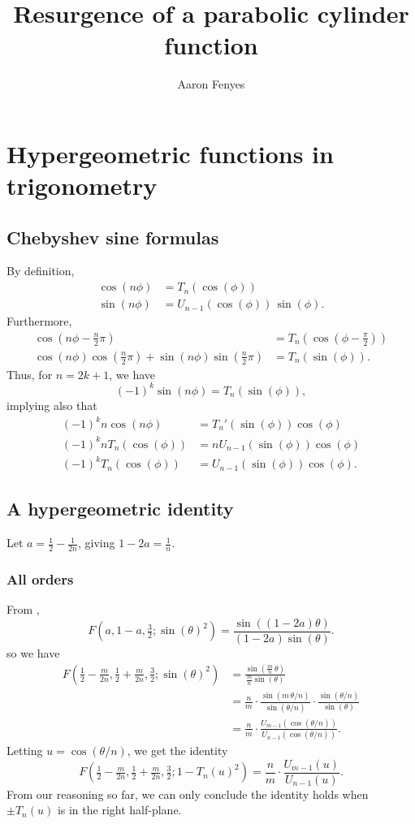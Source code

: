 \documentclass{article}
\title{Resurgence of a parabolic cylinder function}
\author{Aaron Fenyes}
\begin{document}
\maketitle
\section{Hypergeometric functions in trigonometry}
\subsection{Chebyshev sine formulas}
By definition,
\begin{align*}
\cos(n\phi) & = T_n(\cos(\phi)) \\
\sin(n\phi) & = U_{n-1}(\cos(\phi))\,\sin(\phi).
\end{align*}
Furthermore,
\begin{align*}
\cos(n\phi - \tfrac{n}{2}\pi) & = T_n(\cos(\phi - \tfrac{\pi}{2})) \\
\cos(n\phi) \cos(\tfrac{n}{2}\pi) + \sin(n\phi) \sin(\tfrac{n}{2}\pi) & = T_n(\sin(\phi)).
\end{align*}
Thus, for $n = 2k + 1$, we have
\[ (-1)^k \sin(n\phi) = T_n(\sin(\phi)), \]
implying also that
\begin{align*}
(-1)^k n \cos(n\phi) & = T_n'(\sin(\phi)) \cos(\phi) \\
(-1)^k n T_n(\cos(\phi)) & = nU_{n-1}(\sin(\phi)) \cos(\phi) \\
(-1)^k T_n(\cos(\phi)) & = U_{n-1}(\sin(\phi)) \cos(\phi).
\end{align*}
\subsection{A hypergeometric identity}
Let $a = \tfrac{1}{2} - \tfrac{1}{2n}$, giving $1 - 2a = \tfrac{1}{n}$.
\subsubsection{All orders}\label{all-orders}
From \cite[equation~15.4.16]{dlmf},
\[ F(a, 1-a, \tfrac{3}{2}; \sin(\theta)^2) = \frac{\sin((1-2a)\theta)}{(1-2a)\sin(\theta)}. \]
so we have
\begin{align*}
F\left(\tfrac{1}{2} - \tfrac{m}{2n}, \tfrac{1}{2} + \tfrac{m}{2n}, \tfrac{3}{2}; \sin(\theta)^2\right) & = \frac{\sin(\tfrac{m}{n}\,\theta)}{\tfrac{m}{n} \sin(\theta)} \\
& = \frac{n}{m} \cdot \frac{\sin(m\,\theta/n)}{\sin(\theta/n)} \cdot \frac{\sin(\theta/n)}{\sin(\theta)} \\
& = \frac{n}{m} \cdot \frac{U_{m-1}(\cos(\theta/n))}{U_{n-1}(\cos(\theta/n))}.
\end{align*}
Letting $u = \cos(\theta/n)$, we get the identity
\[ F\left(\tfrac{1}{2} - \tfrac{m}{2n}, \tfrac{1}{2} + \tfrac{m}{2n}, \tfrac{3}{2}; 1 - T_n(u)^2\right) = \frac{n}{m} \cdot \frac{U_{m-1}(u)}{U_{n-1}(u)}. \]
From our reasoning so far, we can only conclude the identity holds when $\pm T_n(u)$ is in the right half-plane.
\end{document}
